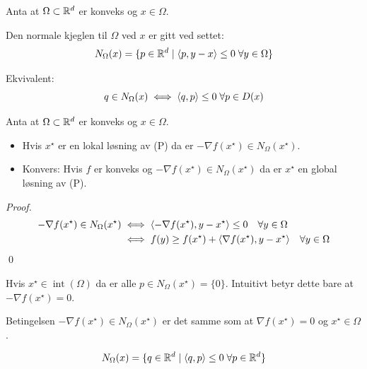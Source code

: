 \begin{definition}{}{}
  Anta at \(\Omega \subset \mathbb{R}^d\) er konveks og \(x \in \Omega\).

  Den normale kjeglen til \(\Omega\) ved \(x\) er gitt ved settet:
  \[
    N_\Omega(x) = \{p \in \mathbb{R}^d \mid \langle p, y - x\rangle \leq 0 \; \forall y \in \Omega\}
  \]

  Ekvivalent:
  \[
    q \in N_\Omega(x) \iff \langle q, p\rangle \leq 0 \; \forall p \in D(x)
  \]

\end{definition}

\begin{proposition}{}{}
  Anta at \(\Omega \subset \mathbb{R}^d\) er konveks og \(x \in \Omega\).
  \begin{itemize}
    \item Hvis \(x^\star\) er en lokal løsning av (P) da er \(-\nabla f(x^\star) \in N_\Omega(x^\star)\).
    \item Konvers: Hvis \(f\) er konveks og \(-\nabla f(x^\star) \in N_\Omega(x^\star)\) da er \(x^\star\) en global løsning av (P).
  \end{itemize}

\end{proposition}
\begin{proof}{}{}
  \begin{align*}
    -\nabla f(x^\star) \in N_\Omega(x^\star) & \iff \langle-\nabla f(x^\star), y - x^\star\rangle \leq 0 \quad \forall y \in \Omega                \\
                                             & \iff f(y) \geq f(x^\star) + \langle\nabla f(x^\star), y - x^\star\rangle \quad \forall y \in \Omega
  \end{align*}
  \qed
\end{proof}
\begin{remark}{}{}
  Hvis \(x^\star \in \operatorname{int}(\Omega)\) da er alle \(p \in N_\Omega(x^\star) = \{0\}\).
  Intuitivt betyr dette bare at \(-\nabla f(x^\star) = 0\).

  Betingelsen \(-\nabla f(x^\star) \in N_\Omega(x^\star)\) er det samme som at \(\nabla f(x^\star) = 0\) og \(x^\star \in \Omega\).

  \[
    N_\Omega(x) = \{q \in \mathbb{R}^d \mid \langle q, p\rangle \leq 0 \; \forall p \in \mathbb{R}^d \}
  \]

\end{remark}

